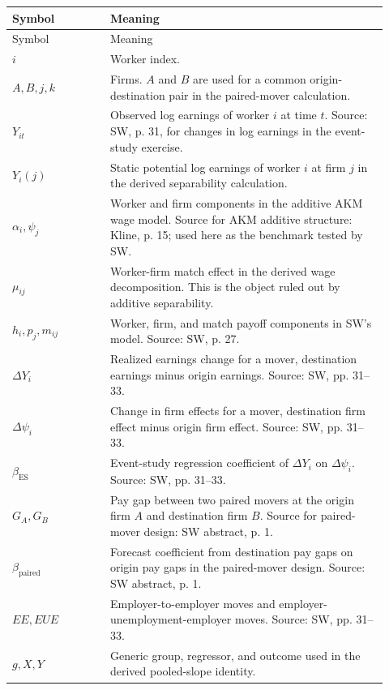 ﻿\documentclass[11pt]{article}
\newcommand{\1}{\mathbf{1}}
\begin{document}
\begin{longtable}{>{\raggedright\arraybackslash}p{0.24\linewidth}
                >{\raggedright\arraybackslash}p{0.68\linewidth}}
\toprule
Symbol & Meaning \\
\midrule
\endfirsthead
\toprule
Symbol & Meaning \\
\midrule
\endhead
$i$ & Worker index. \\
$A,B,j,k$ & Firms. $A$ and $B$ are used for a common origin-destination pair in the paired-mover calculation. \\
$Y_{it}$ & Observed log earnings of worker $i$ at time $t$. Source: SW, p. 31, for changes in log earnings in the event-study exercise. \\
$Y_i(j)$ & Static potential log earnings of worker $i$ at firm $j$ in the derived separability calculation. \\
$\alpha_i,\psi_j$ & Worker and firm components in the additive AKM wage model. Source for AKM additive structure: Kline, p. 15; used here as the benchmark tested by SW. \\
$\mu_{ij}$ & Worker-firm match effect in the derived wage decomposition. This is the object ruled out by additive separability. \\
$h_i,p_j,m_{ij}$ & Worker, firm, and match payoff components in SW's model. Source: SW, p. 27. \\
$\Delta Y_i$ & Realized earnings change for a mover, destination earnings minus origin earnings. Source: SW, pp. 31--33. \\
$\Delta\psi_i$ & Change in firm effects for a mover, destination firm effect minus origin firm effect. Source: SW, pp. 31--33. \\
$\beta_{\mathrm{ES}}$ & Event-study regression coefficient of $\Delta Y_i$ on $\Delta\psi_i$. Source: SW, pp. 31--33. \\
$G_A,G_B$ & Pay gap between two paired movers at the origin firm $A$ and destination firm $B$. Source for paired-mover design: SW abstract, p. 1. \\
$\beta_{\mathrm{paired}}$ & Forecast coefficient from destination pay gaps on origin pay gaps in the paired-mover design. Source: SW abstract, p. 1. \\
$EE,EUE$ & Employer-to-employer moves and employer-unemployment-employer moves. Source: SW, pp. 31--33. \\
$g,X,Y$ & Generic group, regressor, and outcome used in the derived pooled-slope identity. \\
\bottomrule
\end{longtable}
\end{document}
